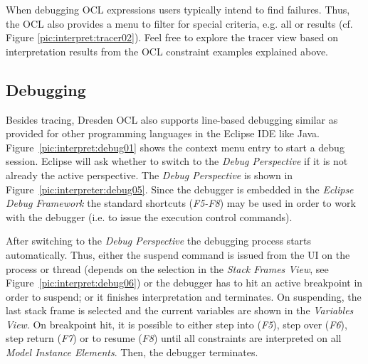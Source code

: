 When debugging OCL expressions users typically intend to find failures. Thus,
the \acs{OCL}  also provides a menu to filter for special
criteria, e.g. all  or  results (cf. Figure
\ref{pic:interpret:tracer02}). Feel free to explore the tracer view based on
interpretation results from the \acs{OCL} constraint examples explained above.

\subsection{Debugging}

Besides tracing, Dresden OCL also supports line-based debugging similar as
provided for other programming languages in the Eclipse IDE like Java. 
Figure~\ref{pic:interpret:debug01} shows the context menu entry to start a
debug session. Eclipse will ask whether to switch to the \emph{Debug
Perspective} if it is not already the active perspective. The \emph{Debug
Perspective} is shown in Figure~\ref{pic:interpreter:debug05}. Since the
debugger is embedded in the \emph{Eclipse Debug Framework} the standard
shortcuts (\emph{F5-F8}) may be used in order to work with the debugger (i.e.
to issue the execution control commands).

After switching to the \emph{Debug Perspective} the debugging process starts
automatically. Thus, either the suspend command is issued from the UI on the
process or thread (depends on the selection in the \emph{Stack Frames View},
see Figure~\ref{pic:interpret:debug06}) or the debugger has to hit an active
breakpoint in order to suspend; or it finishes interpretation and terminates.
On suspending, the last stack frame is selected and the current variables are
shown in the \emph{Variables View}. On breakpoint hit, it is possible to either
step into (\emph{F5}), step over (\emph{F6}), step return (\emph{F7}) or to
resume (\emph{F8}) until all constraints are interpreted on all \emph{Model
Instance Elements}. Then, the debugger terminates.

